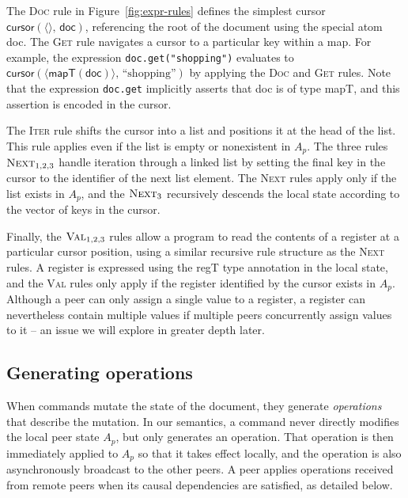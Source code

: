 \documentclass[a4paper,twocolumn,10pt]{article}
\begin{document}
The \textsc{Doc} rule in Figure~\ref{fig:expr-rules} defines the simplest cursor $\mathsf{cursor}(\langle\rangle,\, \mathsf{doc})$, referencing the root of the document using the special atom \textsf{doc}. The \textsc{Get} rule navigates a cursor to a particular key within a map. For example, the expression \verb|doc.get("shopping")| evaluates to $\mathsf{cursor}(\langle \mathsf{mapT}(\mathsf{doc}) \rangle,\, \text{``shopping''})$ by applying the \textsc{Doc} and \textsc{Get} rules. Note that the expression \verb|doc.get| implicitly asserts that \textsf{doc} is of type \textsf{mapT}, and this assertion is encoded in the cursor.

The \textsc{Iter} rule shifts the cursor into a list and positions it at the \textsf{head} of the list. This rule applies even if the list is empty or nonexistent in $A_p$. The three rules $\textsc{Next}_{1,2,3}$ handle iteration through a linked list by setting the final key in the cursor to the identifier of the next list element. The \textsc{Next} rules apply only if the list exists in $A_p$, and the $\textsc{Next}_3$ recursively descends the local state according to the vector of keys in the cursor.

Finally, the $\textsc{Val}_{1,2,3}$ rules allow a program to read the contents of a register at a particular cursor position, using a similar recursive rule structure as the \textsc{Next} rules. A register is expressed using the \textsf{regT} type annotation in the local state, and the \textsc{Val} rules only apply if the register identified by the cursor exists in $A_p$. Although a peer can only assign a single value to a register, a register can nevertheless contain multiple values if multiple peers concurrently assign values to it -- an issue we will explore in greater depth later.

\subsection{Generating operations}

When commands mutate the state of the document, they generate \emph{operations} that describe the mutation. In our semantics, a command never directly modifies the local peer state $A_p$, but only generates an operation. That operation is then immediately applied to $A_p$ so that it takes effect locally, and the operation is also asynchronously broadcast to the other peers. A peer applies operations received from remote peers when its causal dependencies are satisfied, as detailed below.
\end{document}
